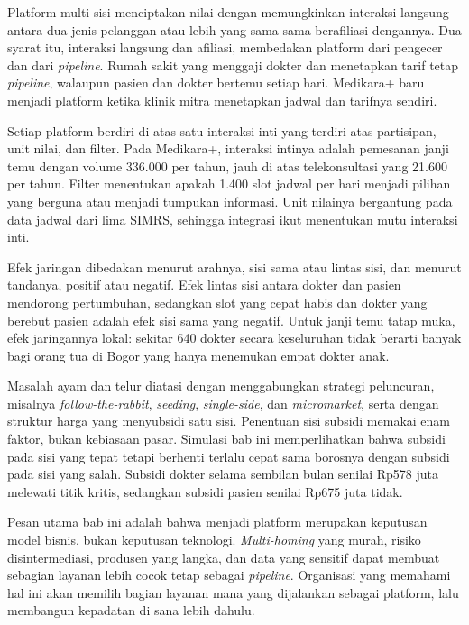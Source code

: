 Platform multi-sisi menciptakan nilai dengan memungkinkan interaksi langsung
antara dua jenis pelanggan atau lebih yang sama-sama berafiliasi dengannya.
Dua syarat itu, interaksi langsung dan afiliasi, membedakan platform dari
pengecer dan dari \textit{pipeline}. Rumah sakit yang menggaji dokter dan
menetapkan tarif tetap \textit{pipeline}, walaupun pasien dan dokter bertemu
setiap hari. Medikara+ baru menjadi platform ketika klinik mitra menetapkan
jadwal dan tarifnya sendiri.

Setiap platform berdiri di atas satu interaksi inti yang terdiri atas
partisipan, unit nilai, dan filter. Pada Medikara+, interaksi intinya adalah
pemesanan janji temu dengan volume 336.000 per tahun, jauh di atas
telekonsultasi yang 21.600 per tahun. Filter menentukan apakah 1.400 slot
jadwal per hari menjadi pilihan yang berguna atau menjadi tumpukan informasi.
Unit nilainya bergantung pada data jadwal dari lima SIMRS, sehingga integrasi
ikut menentukan mutu interaksi inti.

Efek jaringan dibedakan menurut arahnya, sisi sama atau lintas sisi, dan menurut
tandanya, positif atau negatif. Efek lintas sisi antara dokter dan pasien
mendorong pertumbuhan, sedangkan slot yang cepat habis dan dokter yang berebut
pasien adalah efek sisi sama yang negatif. Untuk janji temu tatap muka, efek
jaringannya lokal: sekitar 640 dokter secara keseluruhan tidak berarti banyak bagi orang
tua di Bogor yang hanya menemukan empat dokter anak.

Masalah ayam dan telur diatasi dengan menggabungkan strategi peluncuran,
misalnya \textit{follow-the-rabbit}, \textit{seeding}, \textit{single-side},
dan \textit{micromarket}, serta dengan struktur harga yang menyubsidi satu sisi.
Penentuan sisi subsidi memakai enam faktor, bukan kebiasaan pasar. Simulasi
bab ini memperlihatkan bahwa subsidi pada sisi yang tepat tetapi berhenti
terlalu cepat sama borosnya dengan subsidi pada sisi yang salah. Subsidi dokter
selama sembilan bulan senilai Rp578 juta melewati titik kritis, sedangkan
subsidi pasien senilai Rp675 juta tidak.

Pesan utama bab ini adalah bahwa menjadi platform merupakan keputusan model
bisnis, bukan keputusan teknologi. \textit{Multi-homing} yang murah, risiko
disintermediasi, produsen yang langka, dan data yang sensitif dapat membuat
sebagian layanan lebih cocok tetap sebagai \textit{pipeline}. Organisasi yang
memahami hal ini akan memilih bagian layanan mana yang dijalankan sebagai
platform, lalu membangun kepadatan di sana lebih dahulu.

